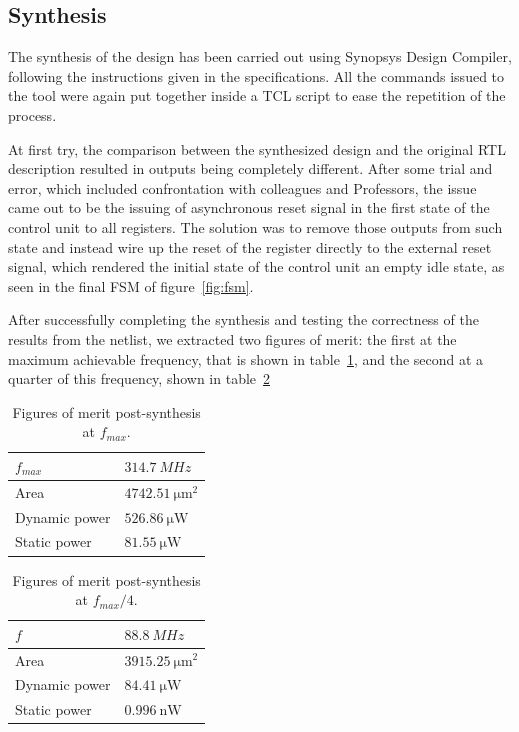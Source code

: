 \documentclass[a4paper]{article}
\begin{document}
\subsection{Synthesis}
The synthesis of the design has been carried out using Synopsys Design Compiler, following the instructions given in the specifications. All the commands issued to the tool were again put together inside a TCL script to ease the repetition of the process. 

At first try, the comparison between the synthesized design and the original RTL description resulted in outputs being completely different. After some trial and error, which included confrontation with colleagues and Professors, the issue came out to be the issuing of asynchronous reset signal in the first state of the control unit to all registers. The solution was to remove those outputs from such state and instead wire up the reset of the register directly to the external reset signal, which rendered the initial state of the control unit an empty idle state, as seen in the final FSM of figure~\ref{fig:fsm}.

After successfully completing the synthesis and testing the correctness of the results from the netlist, we extracted two figures of merit: the first at the maximum achievable frequency, that is shown in table~\ref{tab:base_post_syn_maxf}, and the second at a quarter of this frequency, shown in table~\ref{tab:base_post_syn}

\begin{table}[hbtp]
    \centering
    \begin{tabular}{|l|l|}
    \hline
    $f_{max}$     & $\SI{314.7}{MHz}$              \\ \hline %
    Area          & $\SI{4742.51}{\micro\meter^2}$ \\ \hline %
    Dynamic power & $\SI{526.86}{\micro\watt}$     \\ \hline %
    Static power  & $\SI{81.55}{\micro\watt}$      \\ \hline %
    \end{tabular}
    \caption{Figures of merit post-synthesis at $f_{max}$.}
    \label{tab:base_post_syn_maxf}
\end{table}

\begin{table}[hbtp]
    \centering
    \begin{tabular}{|l|l|}
    \hline
    $f$           & $\SI{88.8}{MHz}$              \\ \hline
    Area          & $\SI{3915.25}{\micro\meter^2}$ \\ \hline
    Dynamic power & $\SI{84.41}{\micro\watt}$     \\ \hline
    Static power  & $\SI{0.996}{\nano\watt}$      \\ \hline
    \end{tabular}
    \caption{Figures of merit post-synthesis at $f_{max}/4$.}
    \label{tab:base_post_syn}
\end{table}
\end{document}
